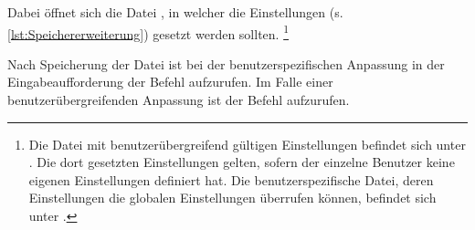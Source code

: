 Dabei öffnet sich die Datei , in welcher die \og Einstellungen (s. \cref{lst:Speichererweiterung}) gesetzt werden sollten.%
\footnote{Die Datei  mit benutzerübergreifend gültigen Einstellungen befindet sich unter
.
Die dort gesetzten Einstellungen gelten, sofern der einzelne Benutzer keine eigenen Einstellungen definiert hat.
Die benutzerspezifische Datei, deren Einstellungen die globalen Einstellungen überrufen können, befindet sich unter
.}

Nach Speicherung der Datei ist bei der benutzerspezifischen Anpassung in der Eingabeaufforderung der Befehl
 aufzurufen.
Im Falle einer benutzerübergreifenden Anpassung ist der Befehl
aufzurufen.